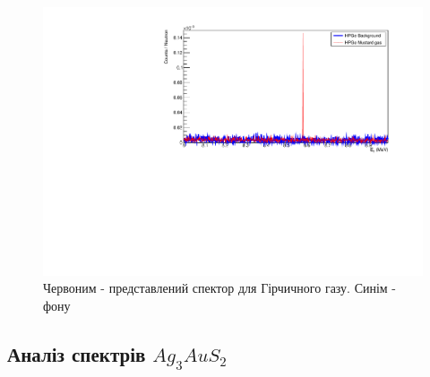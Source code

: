\documentclass[a4paper, 14pt]{article}
\numberwithin{equation}{section}
\numberwithin{table}{section}
\begin{document}
	\begin{figure}[hbt!]
		\centering \includegraphics[width=1\textwidth]{res/mustFon89.pdf}
		\caption{Червоним - представлений спектор для Гірчичного газу. Синім - фону} 
		\label{ris:MustFon89}	
	\end{figure} 
	
\newpage

\subsection{Аналіз спектрів $Ag_3AuS_2$}
\end{document}
